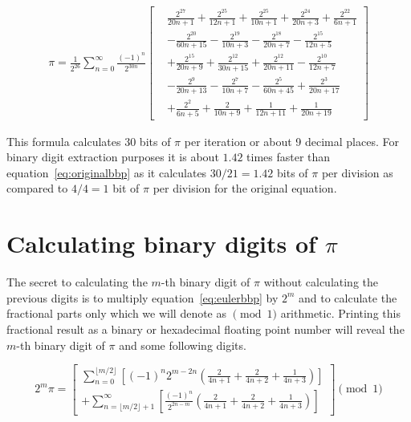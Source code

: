 \documentclass[11pt]{article}
\begin{document}
\begin{equation}
\begin{split}
  \pi
  = \frac{1}{2^{26}} \sum_{n = 0}^\infty \frac{(-1)^n}{2^{30n}} \left[
    \begin{aligned}
    & \frac{2^{27}}{20n+1}
    + \frac{2^{25}}{12n+1}
    + \frac{2^{25}}{10n+1}
    + \frac{2^{24}}{20n+3}
    + \frac{2^{22}}{6n+1} \\
    &- \frac{2^{20}}{60n+15}
    - \frac{2^{19}}{10n+3}
    - \frac{2^{18}}{20n+7}
    - \frac{2^{15}}{12n+5} \\
    &+ \frac{2^{15}}{20n+9}
    + \frac{2^{12}}{30n+15}
    + \frac{2^{12}}{20n+11}
    - \frac{2^{10}}{12n+7} \\
    &- \frac{2^{9}}{20n+13} 
    - \frac{2^{7}}{10n+7}
    - \frac{2^{5}}{60n+45}
    + \frac{2^{3}}{20n+17} \\
    &+ \frac{2^{2}}{6n+5}
    + \frac{2}{10n+9}
    + \frac{1}{12n+11}
    + \frac{1}{20n+19}
    \end{aligned}
  \right]
\end{split}
\end{equation}

\fi                             %

This formula calculates 30 bits of $\pi$ per iteration or about 9 decimal places. For binary digit extraction purposes it is about $1.42$ times faster than equation~\eqref{eq:originalbbp} as it calculates $30/21 = 1.42$ bits of $\pi$ per division as compared to $4/4 = 1$ bit of $\pi$ per division for the original equation.

\section{Calculating binary digits of $\pi$}

The secret to calculating the $m$-th binary digit of $\pi$ without calculating the previous digits is to multiply equation~\eqref{eq:eulerbbp} by $2^m$ and to calculate the fractional parts only which we will denote as $\pmod 1$ arithmetic. Printing this fractional result as a binary or hexadecimal floating point number will reveal the $m$-th binary digit of $\pi$ and some following digits.

\begin{equation}
  2^m \pi = \left[
    \begin{aligned}
      \sum_{n = 0}^{\lfloor m/2 \rfloor} \left[ (-1)^n 2^{m-2n} \left( \frac{2}{4n + 1} + \frac{2}{4n + 2} + \frac{1}{4n + 3} \right) \right] \\
      + \sum_{n = \lfloor m/2 \rfloor+1}^\infty \left[ \frac{(-1)^n}{2^{2n-m}} \left( \frac{2}{4n + 1} + \frac{2}{4n + 2} + \frac{1}{4n + 3} \right) \right]
    \end{aligned}
    \right] \pmod 1
\end{equation}
\end{document}
